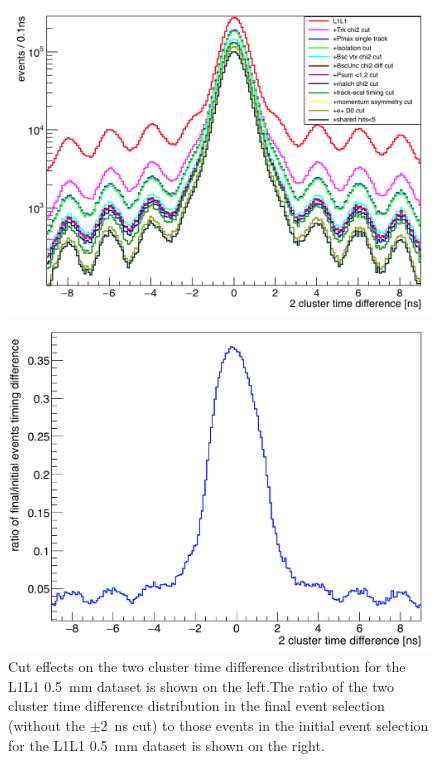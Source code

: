 \begin{figure}[hbt]
\begin{minipage}{0.45\textwidth}
\includegraphics[width=\textwidth]{pics/searching/L1L1_tdiff.png}
\end{minipage}\hfill\begin{minipage}{0.45\textwidth}
 \includegraphics[width=\textwidth]{pics/searching/ratio_tdiff_cuts.png}
 \end{minipage}
 \caption[Cut effects on the time difference between two clusters]{Cut effects on the two cluster time difference distribution for the L1L1 0.5~mm dataset is shown on the left.The ratio of the two cluster time difference distribution in the final event selection (without the $\pm2$~ns cut) to those events in the initial event selection for the L1L1 0.5~mm dataset is shown on the right.}
  \label{fig:l1l1_tdiff}
\end{figure}

